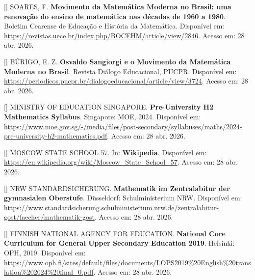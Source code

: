 \documentclass[12pt,a4paper,oneside]{article}
\begin{document}
\begin{singlespace}
\noindent\hangindent=1.25cm
[\theequation\label{ref:mmm-bocehm}]
SOARES, F. \textbf{Movimento da Matemática Moderna no Brasil: uma
renovação do ensino de matemática nas décadas de 1960 a 1980}.
Boletim Cearense de Educação e História da Matemática. Disponível
em: \url{https://revistas.uece.br/index.php/BOCEHM/article/view/2846}.
Acesso em: 28 abr. 2026.\par\smallskip

\noindent\hangindent=1.25cm
[\theequation\label{ref:mmm-burigo}]
BÚRIGO, E. Z. \textbf{Osvaldo Sangiorgi e o Movimento da Matemática
Moderna no Brasil}. Revista Diálogo Educacional, PUCPR. Disponível
em:
\url{https://periodicos.pucpr.br/dialogoeducacional/article/view/3724}.
Acesso em: 28 abr. 2026.\par\smallskip

\noindent\hangindent=1.25cm
[\theequation\label{ref:moe-h2math}]
MINISTRY OF EDUCATION SINGAPORE. \textbf{Pre-University H2
Mathematics Syllabus}. Singapore: MOE, 2024. Disponível em:
\url{https://www.moe.gov.sg/-/media/files/post-secondary/syllabuses/maths/2024-pre-university-h2-mathematics.pdf}.
Acesso em: 28 abr. 2026.\par\smallskip

\noindent\hangindent=1.25cm
[\theequation\label{ref:moscow-school57}]
MOSCOW STATE SCHOOL 57. In: \textbf{Wikipedia}. Disponível em:
\url{https://en.wikipedia.org/wiki/Moscow_State_School_57}. Acesso
em: 28 abr. 2026.\par\smallskip

\noindent\hangindent=1.25cm
[\theequation\label{ref:nrw-mathematik}]
NRW STANDARDSICHERUNG. \textbf{Mathematik im Zentralabitur der
gymnasialen Oberstufe}. Düsseldorf: Schulministerium NRW.
Disponível em:
\url{https://www.standardsicherung.schulministerium.nrw.de/zentralabitur-gost/faecher/mathematik-gost}.
Acesso em: 28 abr. 2026.\par\smallskip

\noindent\hangindent=1.25cm
[\theequation\label{ref:opetus-finland}]
FINNISH NATIONAL AGENCY FOR EDUCATION. \textbf{National Core
Curriculum for General Upper Secondary Education 2019}. Helsinki:
OPH, 2019. Disponível em:
\url{https://www.oph.fi/sites/default/files/documents/LOPS2019\%20English\%20translation\%202024\%20final_0.pdf}.
Acesso em: 28 abr. 2026.\par\smallskip


\end{singlespace}
\end{document}
